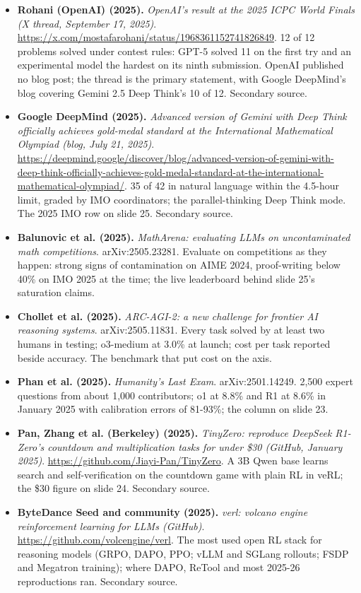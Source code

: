 \documentclass[11pt,letterpaper]{article}
\begin{document}
\begin{itemize}[leftmargin=1.2em,itemsep=3pt]
\item \textbf{Rohani (OpenAI) (2025).} \textit{OpenAI's result at the 2025 ICPC World Finals (X thread, September 17, 2025)}. \url{https://x.com/mostafarohani/status/1968361152741826849}. 12 of 12 problems solved under contest rules: GPT-5 solved 11 on the first try and an experimental model the hardest on its ninth submission. OpenAI published no blog post; the thread is the primary statement, with Google DeepMind's blog covering Gemini 2.5 Deep Think's 10 of 12. Secondary source.
\item \textbf{Google DeepMind (2025).} \textit{Advanced version of Gemini with Deep Think officially achieves gold-medal standard at the International Mathematical Olympiad (blog, July 21, 2025)}. \url{https://deepmind.google/discover/blog/advanced-version-of-gemini-with-deep-think-officially-achieves-gold-medal-standard-at-the-international-mathematical-olympiad/}. 35 of 42 in natural language within the 4.5-hour limit, graded by IMO coordinators; the parallel-thinking Deep Think mode. The 2025 IMO row on slide 25. Secondary source.
\item \textbf{Balunovic et al. (2025).} \textit{MathArena: evaluating LLMs on uncontaminated math competitions}. arXiv:2505.23281. Evaluate on competitions as they happen: strong signs of contamination on AIME 2024, proof-writing below 40\% on IMO 2025 at the time; the live leaderboard behind slide 25's saturation claims.
\item \textbf{Chollet et al. (2025).} \textit{ARC-AGI-2: a new challenge for frontier AI reasoning systems}. arXiv:2505.11831. Every task solved by at least two humans in testing; o3-medium at 3.0\% at launch; cost per task reported beside accuracy. The benchmark that put cost on the axis.
\item \textbf{Phan et al. (2025).} \textit{Humanity's Last Exam}. arXiv:2501.14249. 2,500 expert questions from about 1,000 contributors; o1 at 8.8\% and R1 at 8.6\% in January 2025 with calibration errors of 81-93\%; the column on slide 23.
\item \textbf{Pan, Zhang et al. (Berkeley) (2025).} \textit{TinyZero: reproduce DeepSeek R1-Zero's countdown and multiplication tasks for under \$30 (GitHub, January 2025)}. \url{https://github.com/Jiayi-Pan/TinyZero}. A 3B Qwen base learns search and self-verification on the countdown game with plain RL in veRL; the \$30 figure on slide 24. Secondary source.
\item \textbf{ByteDance Seed and community (2025).} \textit{verl: volcano engine reinforcement learning for LLMs (GitHub)}. \url{https://github.com/volcengine/verl}. The most used open RL stack for reasoning models (GRPO, DAPO, PPO; vLLM and SGLang rollouts; FSDP and Megatron training); where DAPO, ReTool and most 2025-26 reproductions ran. Secondary source.
\end{itemize}
\end{document}

